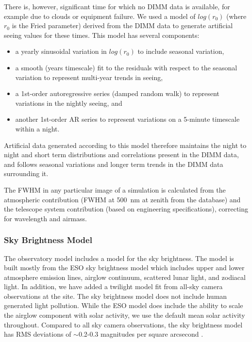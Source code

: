 There is, however, significant time for which no DIMM data is available, for example due to clouds or equipment failure. We used a model of $log(r_{0})$ (where $r_{0}$ is the Fried parameter) derived
from the DIMM data to generate artificial seeing values for these times. This model has several components:
\begin{itemize}
  \item a yearly sinusoidal variation in $log(r_{0})$ to include
    seasonal variation,
  \item a smooth (years timescale) fit to the residuals with respect
    to the seasonal variation to represent multi-year trends in
    seeing,
  \item a 1st-order autoregressive series (damped random walk) to
    represent variations in the nightly seeing, and
  \item another 1st-order AR series to represent variations on a
    5-minute timescale within a night.
\end{itemize}
Artificial data generated according to this model therefore maintains the night to night and short term distributions and correlations present in the DIMM data, and follows seasonal variations and longer term trends in the DIMM data surrounding it. 

The FWHM in any particular image of a simulation is calculated from the atmospheric contribution (FWHM at 500~nm at zenith from the database) and the telescope system contribution (based on engineering specifications), correcting for wavelength and airmass. 

\subsubsection{Sky Brightness Model}

The observatory model includes a model for the sky brightness. The model is built mostly from the ESO sky brightness model which includes upper and lower atmosphere emission lines, airglow continuum, scattered lunar light, and zodiacal light. In addition, we have added a twilight model fit from all-sky camera observations at the site. The sky brightness model does not include human generated light pollution. While the ESO model does include the ability to scale the airglow component with solar activity, we use the default mean solar activity throughout. Compared to all sky camera observations, the sky brightness model has RMS deviations of $\sim$0.2-0.3 magnitudes per square arcsecond \citep{Yoachim16}. 

